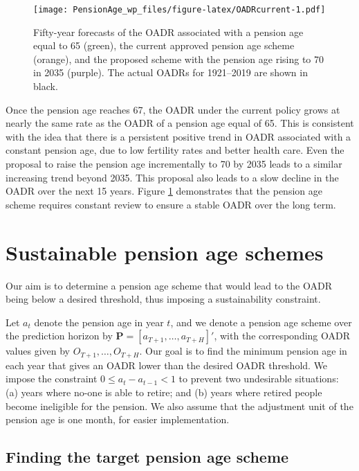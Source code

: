 \documentclass[11pt,a4paper,]{article}
\begin{document}
\begin{figure}
\centering
\texttt{[image: PensionAge\_wp\_files/figure-latex/OADRcurrent-1.pdf]}
\caption{\label{fig:OADRcurrent}Fifty-year forecasts of the OADR associated with a pension age equal to 65 (green), the current approved pension age scheme (orange), and the proposed scheme with the pension age rising to 70 in 2035 (purple). The actual OADRs for 1921--2019 are shown in black.}
\end{figure}

Once the pension age reaches 67, the OADR under the current policy grows at nearly the same rate as the OADR of a pension age equal of 65. This is consistent with the idea that there is a persistent positive trend in OADR associated with a constant pension age, due to low fertility rates and better health care. Even the proposal to raise the pension age incrementally to 70 by 2035 leads to a similar increasing trend beyond 2035. This proposal also leads to a slow decline in the OADR over the next 15 years. Figure \ref{fig:OADRcurrent} demonstrates that the pension age scheme requires constant review to ensure a stable OADR over the long term.

\hypertarget{sec:target}{%
\section{Sustainable pension age schemes}\label{sec:target}}

Our aim is to determine a pension age scheme that would lead to the OADR being below a desired threshold, thus imposing a sustainability constraint.

Let \(a_t\) denote the pension age in year \(t\), and we denote a pension age scheme over the prediction horizon by \(\bm{P}=[a_{T+1},\dots,a_{T+H}]'\), with the corresponding OADR values given by \(O_{T+1},\dots,O_{T+H}\). Our goal is to find the minimum pension age in each year that gives an OADR lower than the desired OADR threshold. We impose the constraint \(0 \le a_t - a_{t-1} < 1\) to prevent two undesirable situations: (a) years where no-one is able to retire; and (b) years where retired people become ineligible for the pension. We also assume that the adjustment unit of the pension age is one month, for easier implementation.

\hypertarget{finding-the-target-pension-age-scheme}{%
\subsection{Finding the target pension age scheme}\label{finding-the-target-pension-age-scheme}}
\end{document}
